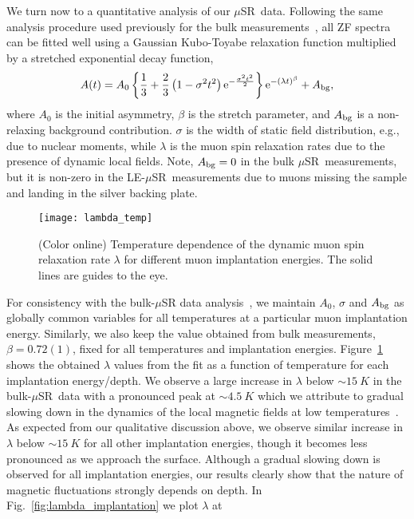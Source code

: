 \documentclass[10pt,aps,prb,twocolumn,showpacs,preprintnumbers,amsmath,amssymb,superscriptaddress,floatfix]{revtex4-1}
\newcommand{\msr}{$\mu$SR}
\newcommand{\lem}{LE-\msr}
\newcommand{\usim}{\sim \!}
\newcommand{\e}{\mathrm{e}}
\begin{document}
We turn now to a quantitative analysis of our \msr\ data. Following
the same analysis procedure used previously for the bulk
measurements~\cite{Biswas2014prb}, all ZF spectra can be fitted well
using a Gaussian Kubo-Toyabe relaxation function multiplied by a
stretched exponential decay function,
\begin{equation}
  A(t)=
  A_0\left\{\frac{1}{3}+\frac{2}{3}\left(1-\sigma^2t^2\right)\e^{-\frac{\sigma^2t^2}{2}}\right\}\e^{-(\lambda
  t)^\beta} +A_{\rm bg},
 \label{eq:KT_ZFequation}
\end{equation}
where $A_0$ is the initial asymmetry, $\beta$ is the stretch
parameter, and $A_{\rm bg}$ is a non-relaxing background
contribution. $\sigma$ is the width of static field distribution,
e.g., due to nuclear moments, while $\lambda$ is the muon spin
relaxation rates due to the presence of dynamic local fields. Note,
$A_{\rm bg}=0$ in the bulk \msr\ measurements, but it is non-zero in
the \lem\ measurements due to muons missing the sample and landing in
the silver backing plate.
\begin{figure}[htb]
\texttt{[image: lambda\_temp]}
\caption{(Color online) Temperature dependence of the dynamic muon
  spin relaxation rate $\lambda$ for different muon implantation
  energies. The solid lines are guides to the eye.}
 \label{fig:lambda_temp}
\end{figure}
For consistency with the bulk-\msr{} data
analysis~\cite{Biswas2014prb}, we maintain $A_0$, $\sigma$ and $A_{\rm
  bg}$ as globally common variables for all temperatures at a
particular muon implantation energy. Similarly, we also keep the value
obtained from bulk measurements, $\beta=0.72(1)$, fixed for all
temperatures and implantation energies. Figure~\ref{fig:lambda_temp}
shows the obtained $\lambda$ values from the fit as a function of
temperature for each implantation energy/depth. We observe a large
increase in $\lambda$ below $\usim\SI{15}{K}$ in the bulk-\msr\ data
with a pronounced peak at $\usim\SI{4.5}{K}$ which we attribute to
gradual slowing down in the dynamics of the local magnetic fields at
low temperatures~\cite{Biswas2014prb}. As expected from our
qualitative discussion above, we observe similar increase in $\lambda$
below $\usim\SI{15}{K}$ for all other implantation energies, though it
becomes less pronounced as we approach the surface. Although a gradual
slowing down is observed for all implantation energies, our results
clearly show that the nature of magnetic fluctuations strongly depends
on depth. In Fig.~\ref{fig:lambda_implantation} we plot $\lambda$ at
\end{document}
